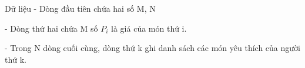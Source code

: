 Dữ liệu
- Dòng đầu tiên chứa hai số M, N   


   - Dòng thứ hai chứa M số $P_{i}$   là giá của món thứ i.   


   - Trong N dòng cuối cùng, dòng thứ k ghi danh sách các món yêu thích của người thứ k.